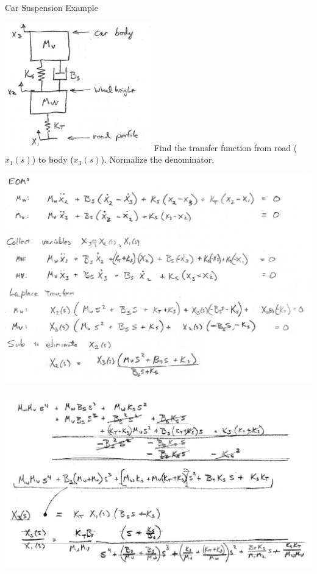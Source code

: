 \begin{Example}\label{ExampleCarSuspensionTF}   %
Car Suspension Example


\includegraphics[width=2.5in]{figs02/00730a.png}    Find the transfer function from road ($x_1(s)$) to body ($x_3(s)$).
Normalize the denominator.


\includegraphics[width=6.25in]{figs02/00731a.png}




\end{Example}

%
\begin{ExampleCont}
%
\includegraphics[width=6.25in]{figs02/00961.png}

\end{ExampleCont}




